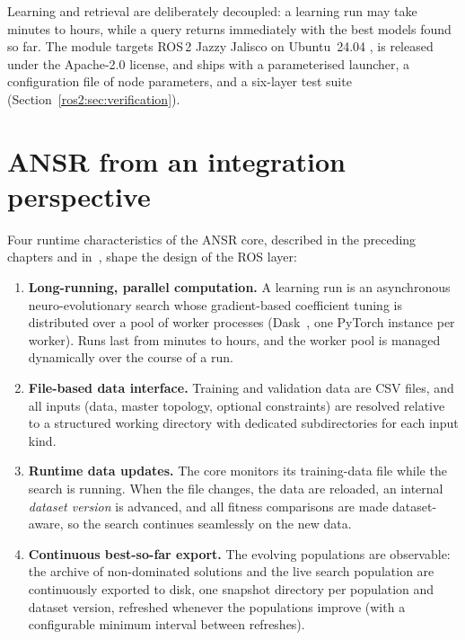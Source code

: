 Learning and retrieval are deliberately decoupled: a learning run may take
minutes to hours, while a query returns immediately with the best models
found so far. The module targets ROS\,2 Jazzy Jalisco on Ubuntu~24.04
\cite{ros2:ros2science}, is released under the Apache-2.0 license, and ships
with a parameterised launcher, a configuration file of node parameters, and a
six-layer test suite (Section~\ref{ros2:sec:verification}).

\section{ANSR from an integration perspective}
\label{ros2:sec:core}

Four runtime characteristics of the ANSR core, described in the preceding
chapters and in~\cite{ros2:n4sr}, shape the design of the ROS layer:

\begin{enumerate}
  \item \textbf{Long-running, parallel computation.} A learning run is an
        asynchronous neuro-evolutionary search whose gradient-based
        coefficient tuning is distributed over a pool of worker processes
        (Dask~\cite{ros2:dask}, one PyTorch instance per worker). Runs last
        from minutes to hours, and the worker pool is managed dynamically
        over the course of a run.
  \item \textbf{File-based data interface.} Training and validation data are
        CSV files, and all inputs (data, master topology, optional
        constraints) are resolved relative to a structured working
        directory with dedicated subdirectories for each input kind.
  \item \textbf{Runtime data updates.} The core monitors its training-data
        file while the search is running. When the file changes, the data
        are reloaded, an internal \emph{dataset version} is advanced, and
        all fitness comparisons are made dataset-aware, so the search
        continues seamlessly on the new data.
  \item \textbf{Continuous best-so-far export.} The evolving populations are
        observable: the archive of non-dominated solutions and the live
        search population are continuously exported to disk, one snapshot
        directory per population and dataset version, refreshed whenever the
        populations improve (with a configurable minimum interval between
        refreshes).
\end{enumerate}

